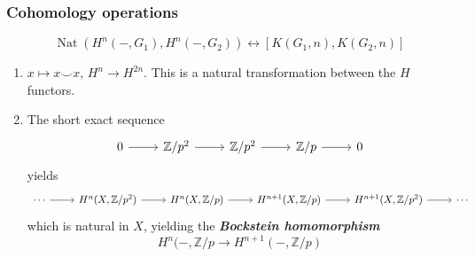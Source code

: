 \documentclass{article}
\newcommand{\Z}{\mathbb{Z}}
\DeclareMathOperator{\Nat}{Nat}
\begin{document}
\subsubsection{Cohomology operations}
\[\Nat(H^n(-,G_1),H^n(-,G_2))\leftrightarrow[K(G_1,n),K(G_2,n)]\]
\begin{example}\leavevmode
	\begin{enumerate}
		\item $x\mapsto x\smile x$, $H^n\to H^{2n}$. This is a natural transformation between the $H$ functors.
		\item The short exact sequence
		\[\begin{tikzcd}
			0\arrow[r]&\Z/p^2\arrow[r]&\Z/p^2\arrow[r]&\Z/p\arrow[r]&0
		\end{tikzcd}\]
		yields
		\[\begin{tikzcd}
			\cdots\arrow[r]&H^n(X,\Z/p^2)\arrow[r]&H^n(X,\Z/p)\arrow[r]&H^{n+1}(X,\Z/p)\arrow[r]&H^{n+1}(X,\Z/p^2)\arrow[r]&\cdots
		\end{tikzcd}\]
		which is natural in $X$, yielding the \textbf{\textit{Bockstein homomorphism}}
		\[H^n(-,\Z/p\to H^{n+1}(-,\Z/p)\]
	\end{enumerate}
\end{example}
\end{document}
